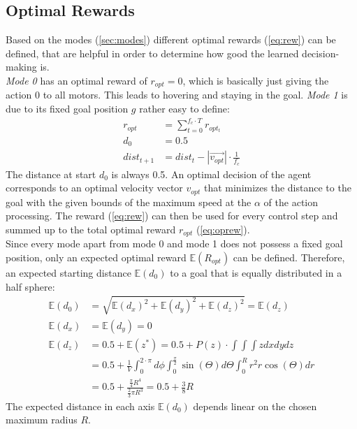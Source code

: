 \subsection{Optimal Rewards}\label{sec:oprew}
Based on the modes (\cref{sec:modes}) different optimal rewards (\cref{eq:rew}) can be defined, 
that are helpful in order to determine how good the learned decision-making is.\\
\emph{Mode 0} has an optimal reward of $r_{opt} = 0$, which is basically just giving the action $0$ to all motors. 
This leads to hovering and staying in the goal.
\emph{Mode 1} is due to its fixed goal position $g$ rather easy to define:
\begin{align}
r_{opt} &= \sum_{t=0}^{f_c \cdot T}  r_{opt_t} \label{eq:oprew}\\
d_0 &= 0.5\\
dist_{t+1} &= dist_t - |\overrightarrow{v_{opt}}| \cdot \frac{1}{f_c} \label{eq:dt1}%
\end{align}
The distance at start $d_0$ is always 0.5. An optimal decision of the agent corresponds to an optimal velocity vector $v_{opt}$ that minimizes 
the distance to the goal with the given bounds of the maximum speed at the $\alpha$ of the action processing. 
The reward (\cref{eq:rew}) can then be used for every control step and summed up to the total optimal reward $r_{opt}$ (\cref{eq:oprew}).\\
Since every mode apart from mode 0 and mode 1 does not possess a fixed goal position, only an expected optimal reward $\mathbb{E}(R_{opt})$ can be defined. 
Therefore, an expected starting distance $\mathbb{E}(d_0)$ to a goal that is equally distributed in a half sphere:
\begin{align}
	\mathbb{E}(d_0) &= \sqrt{\mathbb{E}(d_x)^2 + \mathbb{E}(d_y)^2 + \mathbb{E}(d_z)^2}  = \mathbb{E}(d_z) \\
	\mathbb{E}(d_x) &= \mathbb{E}(d_y) = 0\\
	\mathbb{E}(d_z) &= 0.5 + \mathbb{E}(z^*) = 0.5 + P(z) \cdot \int \int \int  z dx dy dz \nonumber \\
	&= 0.5 + \frac{1}{V} \int_{0}^{2 \cdot \pi} d \phi \int_{0}^{\frac{\pi}{2}} \sin(\Theta) d\Theta \int_{0}^{R} r^2 r \cos(\Theta)  dr  \nonumber \\
	&= 0.5 + \frac{\frac{\pi}{4} R^4}{\frac{2}{3} \pi R^3} = 0.5 + \frac{3}{8} R
\end{align}
The expected distance in each axis $\mathbb{E}(d_0)$ depends linear on the chosen maximum radius $R$. 
